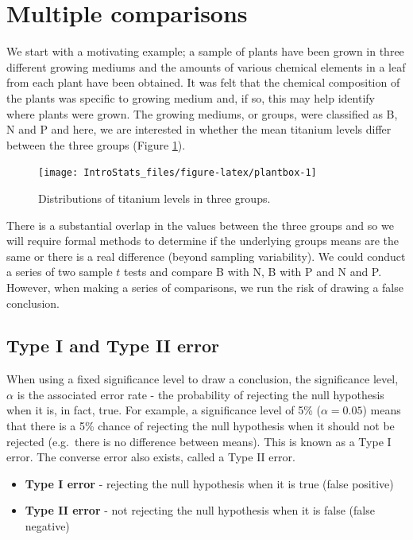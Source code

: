 \documentclass[
  oneside]{krantz}
\begin{document}
\hypertarget{multiple-comparisons}{%
\section{Multiple comparisons}\label{multiple-comparisons}}

We start with a motivating example; a sample of plants have been grown in three different growing mediums and the amounts of various chemical elements in a leaf from each plant have been obtained. It was felt that the chemical composition of the plants was specific to growing medium and, if so, this may help identify where plants were grown. The growing mediums, or groups, were classified as B, N and P and here, we are interested in whether the mean titanium levels differ between the three groups (Figure \ref{fig:plantbox}).

\begin{figure}

{\centering \texttt{[image: IntroStats\_files/figure-latex/plantbox-1]} 

}

\caption{Distributions of titanium levels in three groups.}\label{fig:plantbox}
\end{figure}

There is a substantial overlap in the values between the three groups and so we will require formal methods to determine if the underlying groups means are the same or there is a real difference (beyond sampling variability). We could conduct a series of two sample \(t\) tests and compare B with N, B with P and N and P. However, when making a series of comparisons, we run the risk of drawing a false conclusion.

\hypertarget{type-i-and-type-ii-error}{%
\subsection{Type I and Type II error}\label{type-i-and-type-ii-error}}

When using a fixed significance level to draw a conclusion, the significance level, \(\alpha\) is the associated error rate - the probability of rejecting the null hypothesis when it is, in fact, true. For example, a significance level of 5\% (\(\alpha=0.05\)) means that there is a 5\% chance of rejecting the null hypothesis when it should not be rejected (e.g.~there is no difference between means). This is known as a Type I error. The converse error also exists, called a Type II error.

\begin{itemize}
\item
  \textbf{Type I error} - rejecting the null hypothesis when it is true (false positive)
\item
  \textbf{Type II error} - not rejecting the null hypothesis when it is false (false negative)
\end{itemize}
\end{document}
